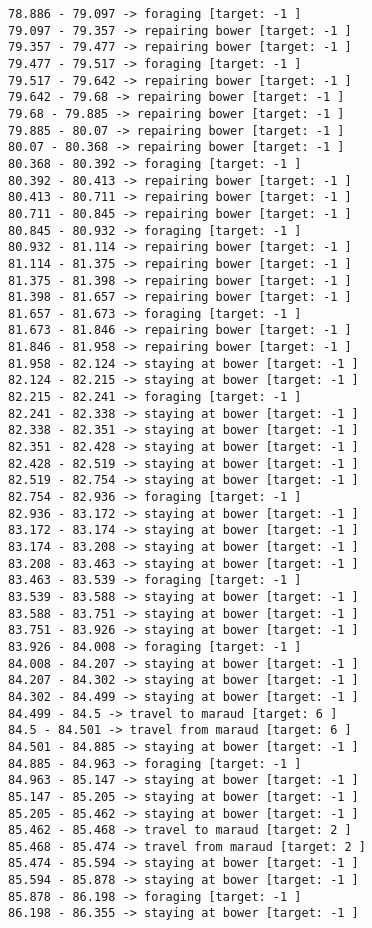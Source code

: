 \documentclass[11pt]{article}
\begin{document}
\begin{Verbatim}[commandchars=\\\{\}]
78.886 - 79.097 -> foraging [target: -1 ]
79.097 - 79.357 -> repairing bower [target: -1 ]
79.357 - 79.477 -> repairing bower [target: -1 ]
79.477 - 79.517 -> foraging [target: -1 ]
79.517 - 79.642 -> repairing bower [target: -1 ]
79.642 - 79.68 -> repairing bower [target: -1 ]
79.68 - 79.885 -> repairing bower [target: -1 ]
79.885 - 80.07 -> repairing bower [target: -1 ]
80.07 - 80.368 -> repairing bower [target: -1 ]
80.368 - 80.392 -> foraging [target: -1 ]
80.392 - 80.413 -> repairing bower [target: -1 ]
80.413 - 80.711 -> repairing bower [target: -1 ]
80.711 - 80.845 -> repairing bower [target: -1 ]
80.845 - 80.932 -> foraging [target: -1 ]
80.932 - 81.114 -> repairing bower [target: -1 ]
81.114 - 81.375 -> repairing bower [target: -1 ]
81.375 - 81.398 -> repairing bower [target: -1 ]
81.398 - 81.657 -> repairing bower [target: -1 ]
81.657 - 81.673 -> foraging [target: -1 ]
81.673 - 81.846 -> repairing bower [target: -1 ]
81.846 - 81.958 -> repairing bower [target: -1 ]
81.958 - 82.124 -> staying at bower [target: -1 ]
82.124 - 82.215 -> staying at bower [target: -1 ]
82.215 - 82.241 -> foraging [target: -1 ]
82.241 - 82.338 -> staying at bower [target: -1 ]
82.338 - 82.351 -> staying at bower [target: -1 ]
82.351 - 82.428 -> staying at bower [target: -1 ]
82.428 - 82.519 -> staying at bower [target: -1 ]
82.519 - 82.754 -> staying at bower [target: -1 ]
82.754 - 82.936 -> foraging [target: -1 ]
82.936 - 83.172 -> staying at bower [target: -1 ]
83.172 - 83.174 -> staying at bower [target: -1 ]
83.174 - 83.208 -> staying at bower [target: -1 ]
83.208 - 83.463 -> staying at bower [target: -1 ]
83.463 - 83.539 -> foraging [target: -1 ]
83.539 - 83.588 -> staying at bower [target: -1 ]
83.588 - 83.751 -> staying at bower [target: -1 ]
83.751 - 83.926 -> staying at bower [target: -1 ]
83.926 - 84.008 -> foraging [target: -1 ]
84.008 - 84.207 -> staying at bower [target: -1 ]
84.207 - 84.302 -> staying at bower [target: -1 ]
84.302 - 84.499 -> staying at bower [target: -1 ]
84.499 - 84.5 -> travel to maraud [target: 6 ]
84.5 - 84.501 -> travel from maraud [target: 6 ]
84.501 - 84.885 -> staying at bower [target: -1 ]
84.885 - 84.963 -> foraging [target: -1 ]
84.963 - 85.147 -> staying at bower [target: -1 ]
85.147 - 85.205 -> staying at bower [target: -1 ]
85.205 - 85.462 -> staying at bower [target: -1 ]
85.462 - 85.468 -> travel to maraud [target: 2 ]
85.468 - 85.474 -> travel from maraud [target: 2 ]
85.474 - 85.594 -> staying at bower [target: -1 ]
85.594 - 85.878 -> staying at bower [target: -1 ]
85.878 - 86.198 -> foraging [target: -1 ]
86.198 - 86.355 -> staying at bower [target: -1 ]

\end{Verbatim}
\end{document}
